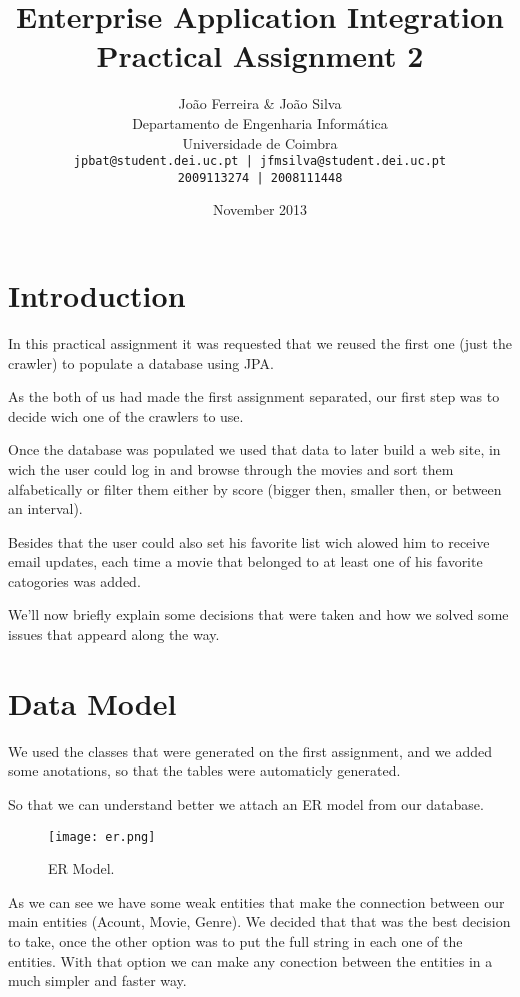 \documentclass[12pt]{article}
\title{Enterprise Application Integration \\ Practical Assignment 2}
\author{
		João Ferreira \& João Silva\\
		Departamento de Engenharia Informática\\
		Universidade de Coimbra\\
		\texttt{jpbat@student.dei.uc.pt | jfmsilva@student.dei.uc.pt}\\
		\texttt{2009113274 | 2008111448}
		}
\date{November 2013}
\begin{document}
\maketitle
\clearpage

\tableofcontents

\setlength{\parindent}{1cm}
\setlength{\parskip}{0.3cm}

\clearpage
\section{Introduction}
\indent \indent In this practical assignment it was requested that we reused the first one (just the crawler) to populate a database using JPA.

As the both of us had made the first assignment separated, our first step was to decide wich one of the crawlers to use.

Once the database was populated we used that data to later build a web site, in wich the user could log in and browse through the movies and sort them alfabetically or filter them either by score (bigger then, smaller then, or between an interval).

Besides that the user could also set his favorite list wich alowed him to receive email updates, each time a movie that belonged to at least one of his favorite catogories was added.

We'll now briefly explain some decisions that were taken and how we solved some issues that appeard along the way.
\clearpage

\section{Data Model}
\indent \indent We used the classes that were generated on the first assignment, and we added some anotations, so that the tables were automaticly generated.

So that we can understand better we attach an ER model from our database.

\begin{figure}[h!]
	\centering
	\texttt{[image: er.png]}
	\caption{ER Model.}
\end{figure}

As we can see we have some weak entities that make the connection between our main entities (Acount, Movie, Genre). We decided that that was the best decision to take, once the other option was to put the full string in each one of the entities. With that option we can make any conection between the entities in a much simpler and faster way.
\end{document}
